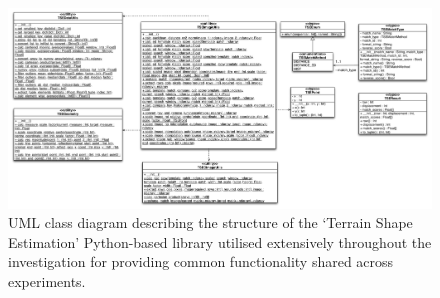 \begin{landscape}

	\begin{figure}[ht!]
\centering
\includegraphics[scale=0.38]{images/tse_class_diagram}
  \caption{UML class diagram describing the structure of the `Terrain Shape Estimation'  Python-based library utilised extensively throughout the investigation for providing common functionality shared across experiments.}
\label{fig:class}
\end{figure} 

\end{landscape}


